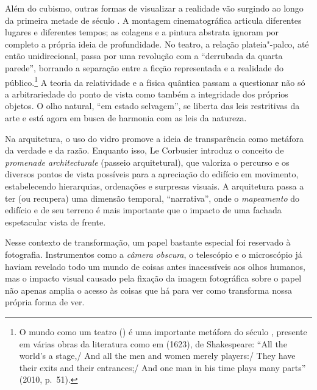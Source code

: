 Além do cubismo, outras formas de visualizar a realidade vão surgindo ao
longo da primeira metade de século . A montagem cinematográfica
articula diferentes lugares e diferentes tempos; as colagens e a pintura
abstrata ignoram por completo a própria ideia de profundidade. No
teatro, a relação plateia"-palco, até então unidirecional, passa por uma
revolução com a ``derrubada da quarta parede'', borrando a separação
entre a ficção representada e a realidade do público.\footnote{O mundo
  como um teatro ({}) é uma importante metáfora do
  século , presente em várias obras da literatura como em {} (1623), de Shakespeare: ``All the world's a stage,/ And all the men and women merely players:/ They have their
  exits and their entrances;/ And one
  man in his time plays many parts'' (2010, p.~51).} A teoria da
relatividade e a física quântica passam a questionar não só a
arbitrariedade do ponto de vista como também a integridade dos próprios
objetos. O olho natural, ``em estado selvagem'', se liberta das leis
restritivas da arte e está agora em busca de harmonia com as leis da
natureza.

Na arquitetura, o uso do vidro promove a ideia de transparência como
metáfora da verdade e da razão. Enquanto isso, Le Corbusier introduz o
conceito de \emph{promenade architecturale} (passeio arquitetural), que
valoriza o percurso e os diversos pontos de vista possíveis para a
apreciação do edifício em movimento, estabelecendo hierarquias,
ordenações e surpresas visuais. A arquitetura passa a ter (ou recupera)
uma dimensão temporal, ``narrativa'', onde o \emph{mapeamento} do
edifício e de seu terreno é mais importante que o impacto de uma fachada
espetacular vista de frente.

Nesse contexto de transformação, um papel bastante especial foi
reservado à fotografia. Instrumentos como a \emph{câmera obscura}, o
telescópio e o microscópio já haviam revelado todo um mundo de coisas
antes inacessíveis aos olhos humanos, mas o impacto visual causado pela
fixação da imagem fotográfica sobre o papel não apenas amplia o acesso
às coisas que há para ver como transforma nossa própria forma de ver.

